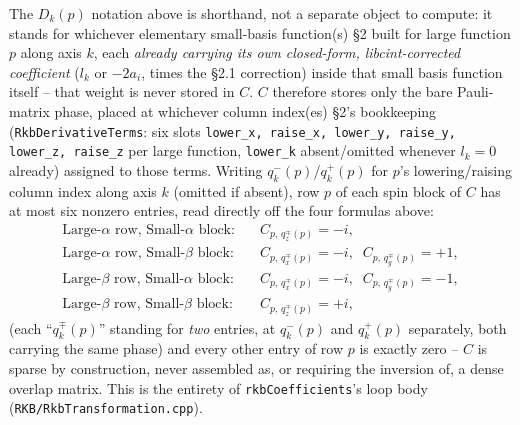 \documentclass[11pt]{article}
\begin{document}
The $D_k(p)$ notation above is shorthand, not a separate object to compute: it stands for whichever
elementary small-basis function(s) \S2 built for large function $p$ along axis $k$, each
\emph{already carrying its own closed-form, libcint-corrected coefficient} ($l_k$ or $-2a_i$, times
the §2.1 correction) inside that small basis function itself -- that weight is never stored in $C$.
$C$ therefore stores only the bare Pauli-matrix phase, placed at whichever column index(es) \S2's
bookkeeping (\texttt{RkbDerivativeTerms}: six slots \texttt{lower\_x, raise\_x, lower\_y, raise\_y,
lower\_z, raise\_z} per large function, \texttt{lower\_k} absent/omitted whenever $l_k=0$ already)
assigned to those terms. Writing $q^{-}_k(p)$/$q^{+}_k(p)$ for $p$'s lowering/raising column index
along axis $k$ (omitted if absent), row $p$ of each spin block of $C$ has at most six nonzero
entries, read directly off the four formulas above:
\begin{align}
\text{Large-}\alpha\text{ row, Small-}\alpha\text{ block:} &\quad C_{p,\,q^{\mp}_z(p)} = -i, \\
\text{Large-}\alpha\text{ row, Small-}\beta\text{ block:} &\quad C_{p,\,q^{\mp}_x(p)} = -i,\;\; C_{p,\,q^{\mp}_y(p)} = +1, \\
\text{Large-}\beta\text{ row, Small-}\alpha\text{ block:} &\quad C_{p,\,q^{\mp}_x(p)} = -i,\;\; C_{p,\,q^{\mp}_y(p)} = -1, \\
\text{Large-}\beta\text{ row, Small-}\beta\text{ block:} &\quad C_{p,\,q^{\mp}_z(p)} = +i,
\end{align}
(each ``$q^{\mp}_k(p)$'' standing for \emph{two} entries, at $q^{-}_k(p)$ and $q^{+}_k(p)$
separately, both carrying the same phase) and every other entry of row $p$ is exactly zero -- $C$ is
sparse by construction, never assembled as, or requiring the inversion of, a dense overlap matrix.
This is the entirety of \texttt{rkbCoefficients}'s loop body (\texttt{RKB/RkbTransformation.cpp}).
\end{document}
